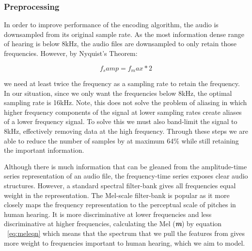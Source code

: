 

\subsubsection{Preprocessing}

In order to improve performance of the encoding algorithm, the audio is downsampled from its original sample rate. As the most information dense range of hearing is below 8kHz, the audio files are downsampled to only retain those frequencies. However, by Nyquist's Theorem:

\begin{equation} \label{eq:nyq}
    f_samp = f_max * 2
\end{equation}

we need at least twice the frequency as a sampling rate to retain the frequency. In our situation, since we only want the frequencies below 8kHz, the optimal sampling rate is 16kHz. Note, this does not solve the problem of aliasing in which higher frequency components of the signal at lower sampling rates create aliases of a lower frequency signal. To solve this we must also band-limit the signal to 8kHz, effectively removing data at the high frequency. Through these steps we are able to reduce the number of samples by at maximum 64\% while still retaining the important information.

Although there is much information that can be gleaned from the amplitude-time series representation of an audio file, the frequency-time series exposes clear audio structures. However, a standard spectral filter-bank gives all frequencies equal weight in the representation. The Mel-scale filter-bank is popular as it more closely maps the frequency representation to the perceptual scale of pitches in human hearing. It is more discriminative at lower frequencies and less discriminative at higher frequencies, calculating the Mel (\textbf{\textit{m}}) by equation ~\cref{eq:meleqn} which means that the spectrum that we pull the features from gives more weight to frequencies important to human hearing, which we aim to model.

